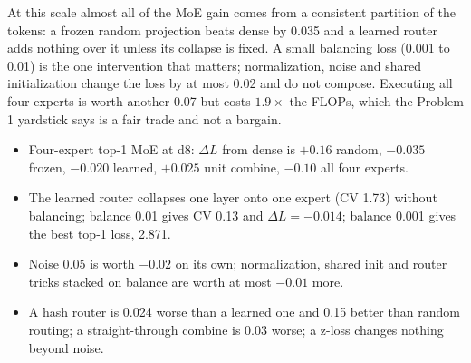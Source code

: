  At this scale almost all of the MoE gain comes from a consistent partition of the tokens: a frozen random projection beats dense by 0.035 and a learned router adds nothing over it unless its collapse is fixed. A small balancing loss (0.001 to 0.01) is the one intervention that matters; normalization, noise and shared initialization change the loss by at most 0.02 and do not compose. Executing all four experts is worth another 0.07 but costs $1.9\times$ the FLOPs, which the Problem 1 yardstick says is a fair trade and not a bargain.

\begin{itemize}
\item Four-expert top-1 MoE at d8: $\Delta L$ from dense is $+0.16$ random, $-0.035$ frozen, $-0.020$ learned, $+0.025$ unit combine, $-0.10$ all four experts.
\item The learned router collapses one layer onto one expert (CV 1.73) without balancing; balance 0.01 gives CV 0.13 and $\Delta L=-0.014$; balance 0.001 gives the best top-1 loss, 2.871.
\item Noise 0.05 is worth $-0.02$ on its own; normalization, shared init and router tricks stacked on balance are worth at most $-0.01$ more.
\item A hash router is 0.024 worse than a learned one and 0.15 better than random routing; a straight-through combine is 0.03 worse; a z-loss changes nothing beyond noise.
\end{itemize}
